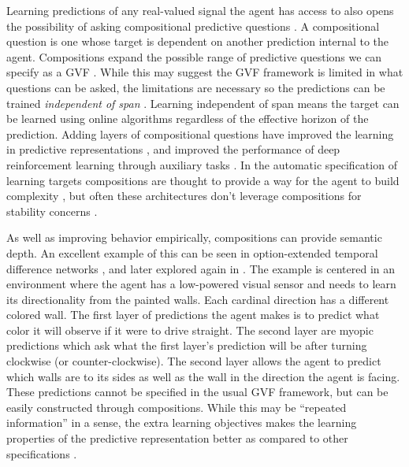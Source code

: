 \documentclass[11pt]{article} %
\begin{document}
Learning predictions of any real-valued signal the agent has access to
also opens the possibility of asking compositional predictive
questions \parencite{white2015}. A compositional question is one whose
target is dependent on another prediction internal to the
agent. Compositions expand the possible range of predictive questions
we can specify as a GVF  \parencite{sutton2004temporal,
  rafols2006, white2015, schlegel2021general,
  zheng2021learning}. While this may suggest the GVF framework is
limited in what questions can be asked, the limitations are necessary
so the predictions can be trained \emph{independent of
span} \parencite{van2015learning}. Learning independent of span means the
target can be learned using online algorithms regardless of the effective horizon
of the prediction. Adding layers of compositional questions have
improved the learning in predictive representations
\parencite{rafols2006, schlegel2021general}, and improved the performance
of deep reinforcement learning through auxiliary tasks
\parencite{zheng2021learning}. In the automatic specification of
learning targets compositions are thought to provide a way for the agent
to build complexity \parencite{schlegel2021general, veeriah2019discovery,
kearney2022, zheng2021learning}, but often these architectures don't
leverage compositions for stability concerns
\parencite{schlegel2021general}. 


As well as improving behavior empirically, compositions can provide
semantic depth. An excellent example of this can be seen in
option-extended temporal difference networks \parencite{rafols2006},
and later explored again in \cite{schlegel2021general}.
The example is centered in an environment where the agent has a
low-powered visual sensor and needs to learn its directionality from
the painted walls. Each cardinal
direction has a different colored wall. The first layer of predictions
the agent makes is to predict what color it will observe if it were to
drive straight. The second layer are myopic predictions
which ask what the first layer's prediction will be after turning
clockwise (or counter-clockwise). The second layer allows the agent to
predict which walls are to its sides as well as the wall in the
direction the agent is facing.
These predictions cannot be specified in the usual GVF framework,
but can be easily constructed through compositions.
While this may be ``repeated information'' in a sense, the extra
learning objectives makes the learning properties of the predictive
representation better as compared to other specifications \parencite{schlegel2021general}.
\end{document}
